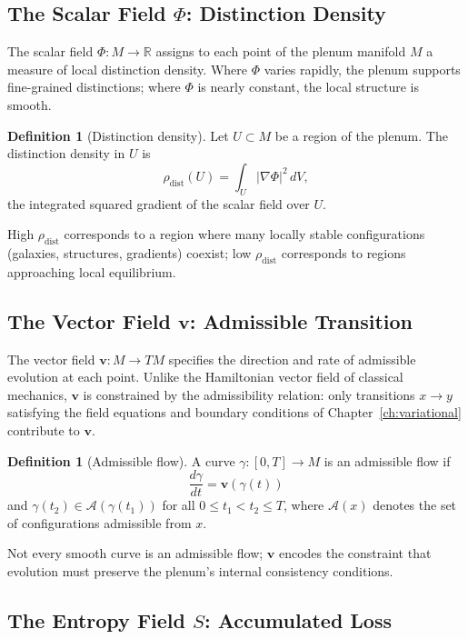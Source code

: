 \documentclass[12pt,a4paper,twoside,openright]{book}
\theoremstyle{plain}
\theoremstyle{definition}
\newtheorem{definition}[theorem]{Definition}
\theoremstyle{remark}
\newcommand{\vfield}{\bm{v}}
\newcommand{\Sfield}{S}
\newcommand{\Phifield}{\Phi}
\newcommand{\Adm}{\mathcal{A}}
\begin{document}
\subsection{The Scalar Field \texorpdfstring{$\Phifield$}{Phi}: Distinction Density}

The scalar field $\Phifield: M \to \mathbb{R}$ assigns to each point of the plenum manifold $M$ a measure of local distinction density. Where $\Phifield$ varies rapidly, the plenum supports fine-grained distinctions; where $\Phifield$ is nearly constant, the local structure is smooth.

\begin{definition}[Distinction density]
Let $U \subset M$ be a region of the plenum. The distinction density in $U$ is
\[
\rho_{\mathrm{dist}}(U) = \int_U |\nabla \Phifield|^2 \, dV,
\]
the integrated squared gradient of the scalar field over $U$.
\end{definition}

High $\rho_{\mathrm{dist}}$ corresponds to a region where many locally stable configurations (galaxies, structures, gradients) coexist; low $\rho_{\mathrm{dist}}$ corresponds to regions approaching local equilibrium.

\subsection{The Vector Field \texorpdfstring{$\vfield$}{v}: Admissible Transition}

The vector field $\vfield: M \to TM$ specifies the direction and rate of admissible evolution at each point. Unlike the Hamiltonian vector field of classical mechanics, $\vfield$ is constrained by the admissibility relation: only transitions $x \to y$ satisfying the field equations and boundary conditions of Chapter~\ref{ch:variational} contribute to $\vfield$.

\begin{definition}[Admissible flow]
A curve $\gamma: [0,T] \to M$ is an admissible flow if
\[
\frac{d\gamma}{dt} = \vfield(\gamma(t))
\]
and $\gamma(t_2) \in \Adm(\gamma(t_1))$ for all $0 \leq t_1 < t_2 \leq T$, where $\Adm(x)$ denotes the set of configurations admissible from $x$.
\end{definition}

Not every smooth curve is an admissible flow; $\vfield$ encodes the constraint that evolution must preserve the plenum's internal consistency conditions.

\subsection{The Entropy Field \texorpdfstring{$\Sfield$}{S}: Accumulated Loss}
\end{document}
